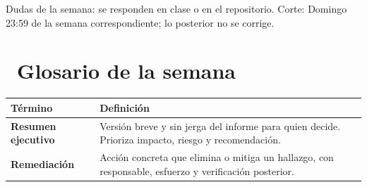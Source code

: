 \documentclass[11pt,a4paper]{article}
\newcommand{\iconotexto}[2]{\textcolor{cyanNeon}{\faIcon{#1}}~#2}
\begin{document}
\begin{cajaRecuerda}Dudas de la semana: se responden en clase o en el repositorio. Corte: Domingo 23:59 de la semana correspondiente; lo posterior no se corrige.
\end{cajaRecuerda}

\clearpage

\section{\iconotexto{book}{Glosario de la semana}}

\small
\begin{longtable}{@{}>{\raggedright\arraybackslash}p{4.2cm}>{\raggedright\arraybackslash}p{\dimexpr\linewidth-4.2cm-12pt\relax}@{}}
\toprule
\textbf{Término} & \textbf{Definición}\\
\midrule
\endhead
\bottomrule
\endlastfoot
\textbf{Resumen ejecutivo} & Versión breve y sin jerga del informe para quien decide. Prioriza impacto, riesgo y recomendación.\\
\textbf{Remediación} & Acción concreta que elimina o mitiga un hallazgo, con responsable, esfuerzo y verificación posterior.\\
\end{longtable}
\end{document}

